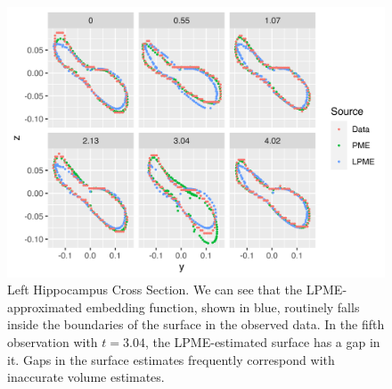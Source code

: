 \documentclass[11pt,reqno]{article}
\renewcommand{\textwidth}{180mm}
\theoremstyle{definition}
\begin{document}

\begin{figure}[h]
  \centering
  \includegraphics[width=\textwidth]{adni_plots/adni_cross_section}
  \caption{Left Hippocampus Cross Section. We can see that the LPME-approximated embedding function, shown in blue, routinely falls inside the boundaries of the surface in the observed data. In the fifth observation with $t=3.04$, the LPME-estimated surface has a gap in it. Gaps in the surface estimates frequently correspond with inaccurate volume estimates.}
  \label{fig:lhipp_cross_sections}
\end{figure}
\end{document}
